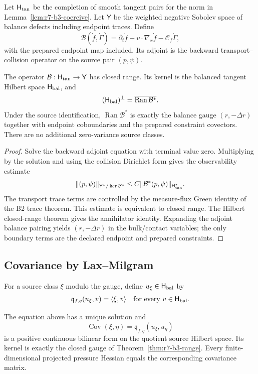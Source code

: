 Let $\mathsf H_{\rm tan}$ be the completion of smooth tangent pairs for the
norm in Lemma~\ref{lem:r7-b3-coercive}.  Let $\mathsf Y$ be the weighted
negative Sobolev space of balance defects including endpoint traces.  Define
\[
 \mathcal B(\dot f,\dot\Gamma)
 =\partial_t\dot f+v\cdot\nabla_x\dot f
  -\mathcal C_f\dot\Gamma,
\]
with the prepared endpoint map included.  Its adjoint is the backward
transport--collision operator on the source pair $(p,\psi)$.

\begin{theorem}
\label{thm:r7-b3-range}
The operator $\mathcal B:\mathsf H_{\rm tan}\to\mathsf Y$ has closed range.
Its kernel is the balanced tangent Hilbert space
$\mathsf H_{\rm bal}$, and
\[
 (\mathsf H_{\rm bal})^\perp
 =\overline{\operatorname{Ran}\mathcal B^*}.
\]
Under the source identification,
$\operatorname{Ran}\mathcal B^*$ is exactly the balance gauge
$(r,-\Delta r)$ together with endpoint coboundaries and the prepared
constraint covectors.  There are no additional zero-variance source classes.
\end{theorem}

\begin{proof}
Solve the backward adjoint equation with terminal value zero.  Multiplying by
the solution and using the collision Dirichlet form gives the observability
estimate
\[
 \|(p,\psi)\|_{\mathsf Y^*/\ker\mathcal B^*}
 \le C\|\mathcal B^*(p,\psi)\|_{\mathsf H_{\rm tan}^*}.
\]
The transport trace terms are controlled by the measure-flux Green identity of
the B2 trace theorem.  This estimate is equivalent to closed range.  The
Hilbert closed-range theorem gives the annihilator identity.  Expanding the
adjoint balance pairing yields $(r,-\Delta r)$ in the bulk/contact variables;
the only boundary terms are the declared endpoint and prepared constraints.
\end{proof}

\subsection{Covariance by Lax--Milgram}

For a source class $\xi$ modulo the gauge, define $u_\xi\in\mathsf H_{\rm bal}$
by
\[
 \mathfrak q_{f,q}(u_\xi,v)=\langle\xi,v\rangle
 \quad\hbox{for every }v\in\mathsf H_{\rm bal}.
\]

\begin{theorem}
\label{thm:r7-b3-covariance}
The equation above has a unique solution and
\[
 \operatorname{Cov}(\xi,\eta)
 =\mathfrak q_{f,q}(u_\xi,u_\eta)
\]
is a positive continuous bilinear form on the quotient source Hilbert space.
Its kernel is exactly the closed gauge of
Theorem~\ref{thm:r7-b3-range}.  Every finite-dimensional projected pressure
Hessian equals the corresponding covariance matrix.
\end{theorem}

